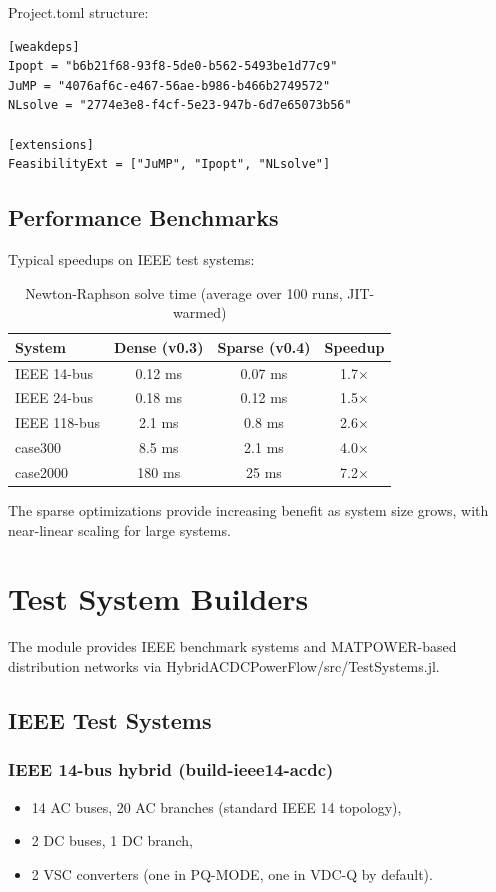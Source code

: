 \documentclass[11pt]{article}
\def\code#1{#1}%
\def\file#1{#1}%
\def\_{-}%
\newcommand{\code}[1]{\nolinkurl{#1}}
\newcommand{\file}[1]{\path{#1}}
\begin{document}
\code{Project.toml} structure:
\begin{lstlisting}
[weakdeps]
Ipopt = "b6b21f68-93f8-5de0-b562-5493be1d77c9"
JuMP = "4076af6c-e467-56ae-b986-b466b2749572"
NLsolve = "2774e3e8-f4cf-5e23-947b-6d7e65073b56"

[extensions]
FeasibilityExt = ["JuMP", "Ipopt", "NLsolve"]
\end{lstlisting}

\subsection{Performance Benchmarks}
Typical speedups on IEEE test systems:
\begin{table}[h]
\centering
\begin{tabular}{l c c c}
\toprule
System & Dense (v0.3) & Sparse (v0.4) & Speedup \\
\midrule
IEEE 14-bus  & 0.12 ms & 0.07 ms & 1.7$\times$ \\
IEEE 24-bus  & 0.18 ms & 0.12 ms & 1.5$\times$ \\
IEEE 118-bus & 2.1 ms  & 0.8 ms  & 2.6$\times$ \\
case300      & 8.5 ms  & 2.1 ms  & 4.0$\times$ \\
case2000     & 180 ms  & 25 ms   & 7.2$\times$ \\
\bottomrule
\end{tabular}
\caption{Newton-Raphson solve time (average over 100 runs, JIT-warmed)}
\end{table}

The sparse optimizations provide increasing benefit as system size grows, with near-linear scaling for large systems.

\section{Test System Builders}

The module provides IEEE benchmark systems and MATPOWER-based distribution networks via \file{HybridACDCPowerFlow/src/TestSystems.jl}.

\subsection{IEEE Test Systems}

\subsubsection{IEEE 14-bus hybrid (\code{build\_ieee14\_acdc})}
\begin{itemize}[leftmargin=*]
  \item 14 AC buses, 20 AC branches (standard IEEE 14 topology),
  \item 2 DC buses, 1 DC branch,
  \item 2 VSC converters (one in \code{PQ\_MODE}, one in \code{VDC\_Q} by default).
\end{itemize}
\end{document}
